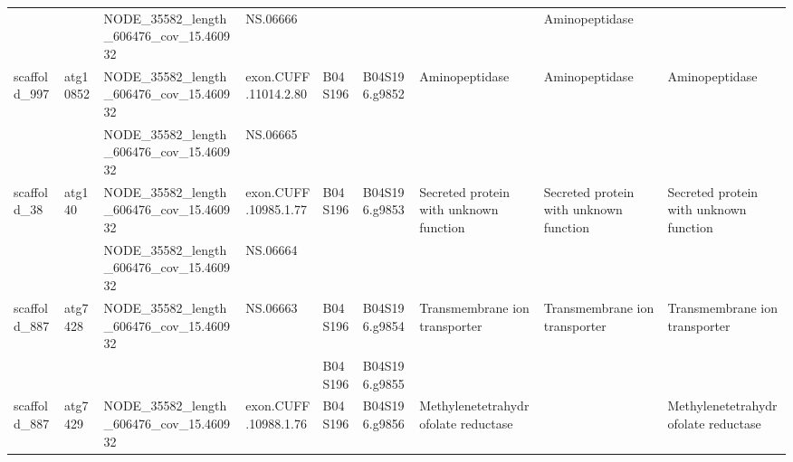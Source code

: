 \begin{longtable}{lllllllll}
                &               &  NODE\_35582\_length\_606476\_cov\_15.460932 &              NS.06666 &              &                &                                                  &                                   Aminopeptidase &                                                \\
   scaffold\_997 &      atg10852 &  NODE\_35582\_length\_606476\_cov\_15.460932 &  exon.CUFF.11014.2.80 &      B04S196 &  B04S196.g9852 &                                   Aminopeptidase &                                   Aminopeptidase &                                 Aminopeptidase \\
                &               &  NODE\_35582\_length\_606476\_cov\_15.460932 &              NS.06665 &              &                &                                                  &                                                  &                                                \\
    scaffold\_38 &        atg140 &  NODE\_35582\_length\_606476\_cov\_15.460932 &  exon.CUFF.10985.1.77 &      B04S196 &  B04S196.g9853 &           Secreted protein with unknown function &           Secreted protein with unknown function &         Secreted protein with unknown function \\
                &               &  NODE\_35582\_length\_606476\_cov\_15.460932 &              NS.06664 &              &                &                                                  &                                                  &                                                \\
   scaffold\_887 &       atg7428 &  NODE\_35582\_length\_606476\_cov\_15.460932 &              NS.06663 &      B04S196 &  B04S196.g9854 &                    Transmembrane ion transporter &                    Transmembrane ion transporter &                  Transmembrane ion transporter \\
                &               &                                         &                       &      B04S196 &  B04S196.g9855 &                                                  &                                                  &                                                \\
   scaffold\_887 &       atg7429 &  NODE\_35582\_length\_606476\_cov\_15.460932 &  exon.CUFF.10988.1.76 &      B04S196 &  B04S196.g9856 &              Methylenetetrahydrofolate reductase &                                                  &            Methylenetetrahydrofolate reductase \\

\end{longtable}
